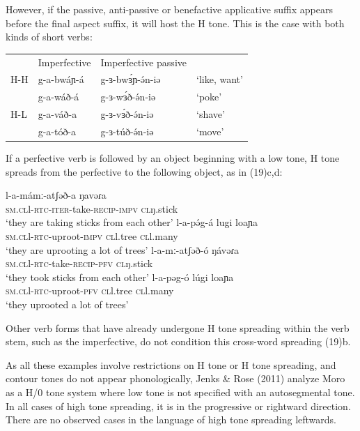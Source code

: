 However, if the passive, anti-passive or benefactive applicative suffix appears before the final aspect suffix, it will host the H tone. This is the case with both kinds of short verbs:

\ea
\begin{tabular}[t]{llll}
	&	Imperfective	&	Imperfective passive &	\\
H-H &	g-a-bwáɲ-á		&	g-ɜ-bwɜ́ɲ-ə́n-iə		&	‘like, want’\\
	&	g-a-wáð-á	&	g-ɜ-wɜ́ð-ə́n-iə		&	‘poke’\\
H-L	&	g-a-váð-a	&	g-ɜ-vɜ́ð-ə́n-iə		&	‘shave’\\
	&	g-a-tóð-a	&	g-ɜ-túð-ə́n-iə	&	‘move’\\
\end{tabular}
\z

If a perfective verb is followed by an object beginning with a low tone, H tone spreads from the perfective to the following object, as in (19)c,d:

\ea
\begin{xlist}
	\ex \gll l-a-mámː-atʃəð-a ŋavəɾa\\
			\textsc{sm}.\textsc{cl}l-\textsc{rtc}-\textsc{iter}-take-\textsc{recip}-\textsc{impv} \textsc{cl}ŋ.stick\\
			\trans	‘they are taking sticks from each other’
	\ex \gll l-a-pə́g-á 	lugi 	loaɲa\\
			\textsc{sm}.\textsc{cl}l-\textsc{rtc}-uproot-\textsc{impv} \textsc{cl}l.tree	\textsc{cl}l.many\\
			\trans	‘they are uprooting a lot of trees’
	\ex \gll	l-a-mː-atʃəð-ó 				ŋávəɾa\\
			\textsc{sm}.\textsc{cl}l-\textsc{rtc}-take-\textsc{recip}-\textsc{pfv}		\textsc{cl}ŋ.stick\\
			\trans	‘they took sticks from each other’
	\ex \gll l-a-pəg-ó 	lúgi 	loaɲa\\
			\textsc{sm}.\textsc{cl}l-\textsc{rtc}-uproot-\textsc{pfv}	\textsc{cl}l.tree	\textsc{cl}l.many\\
			\trans	‘they uprooted a lot of trees’
\end{xlist}
\z

Other verb forms that have already undergone H tone spreading within the verb stem, such as the imperfective, do not condition this cross-word spreading (19)b.

As all these examples involve restrictions on H tone or H tone spreading, and contour tones do not appear phonologically, Jenks \& Rose (2011) analyze Moro as a H/0 tone system where low tone is not specified with an autosegmental tone. In all cases of high tone spreading, it is in the progressive or rightward direction. There are no observed cases in the language of high tone spreading leftwards. 


